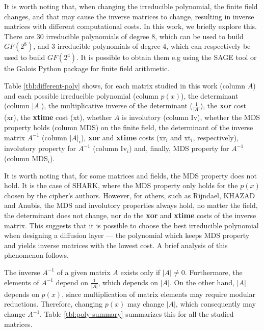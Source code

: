 It is worth noting that, when changing the irreducible polynomial, the finite field changes, and that may cause the inverse matrices to change, resulting in inverse matrices with different computational costs. In this work, we briefly explore this. There are 30 irreducible polynomials of degree 8, which can be used to build $GF(2^8)$, and 3 irreducible polynomials of degree 4, which can respectively be used to build $GF(2^4)$. It is possible to obtain them e.g using the SAGE tool \cite{sagemath} or the Galois Python package \cite{galoispython} for finite field arithmetic.

Table \ref{tbl:different-poly} shows, for each matrix studied in this work (column $A$) and each possible irreducible polynomial (column $p(x)$), the determinant (column $|A|$), the multiplicative inverse of the determinant ($\frac{1}{|A|}$), the \textbf{xor} cost (xr), the \textbf{xtime} cost (xt), whether $A$ is involutory (column Iv), whether the MDS property holds (column MDS) on the finite field, the determinant of the inverse matrix $A^{-1}$ (column $|A|_i$), \textbf{xor} and \textbf{xtime} costs (xr$_i$ and xt$_i$, respectively), involutory property for $A^{-1}$ (column Iv$_i$) and, finally, MDS property for $A^{-1}$ (column MDS$_i$).

It is worth noting that, for some matrices and fields, the MDS property does not hold. It is the case of SHARK, where the MDS property only holds for the $p(x)$ chosen by the cipher's authors. However, for others, such as Rijndael, KHAZAD and Anubis, the MDS and involutory properties always hold, no matter the field, the determinant does not change, nor do the \textbf{xor} and \textbf{xtime} costs of the inverse matrix. This suggests that it is possible to choose the best irreducible polynomial when designing a diffusion layer --- the polynomial which keeps MDS property and yields inverse matrices with the lowest cost. A brief analysis of this phenomenon follows.

The inverse $A^{-1}$ of a given matrix $A$ exists only if $|A| \neq 0$. Furthermore, the elements of $A^{-1}$ depend on $\frac{1}{|A|}$, which depends on $|A|$. On the other hand, $|A|$ depends on $p(x)$, since multiplication of matrix elements may require modular reductions. Therefore, changing $p(x)$ may change $|A|$, which consequently may change $A^{-1}$. Table \ref{tbl:poly-summary} summarizes this for all the studied matrices.

